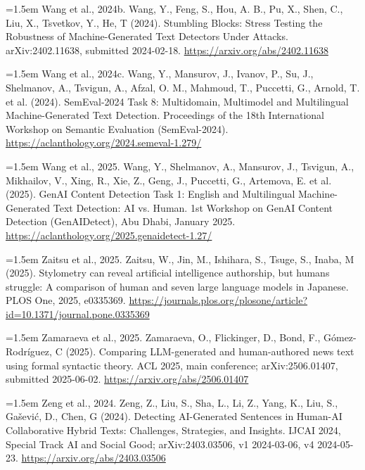 \documentclass[11pt,a4paper]{article}
\renewcommand{\_}{\textunderscore\allowbreak}
\begin{document}
\noindent\hangindent=1.5em Wang et al., 2024b. Wang, Y., Feng, S., Hou, A. B., Pu, X., Shen, C., Liu, X., Tsvetkov, Y., He, T (2024). Stumbling Blocks: Stress Testing the Robustness of Machine-Generated Text Detectors Under Attacks. arXiv:2402.11638, submitted 2024-02-18. \url{https://arxiv.org/abs/2402.11638}\par\smallskip

\noindent\hangindent=1.5em Wang et al., 2024c. Wang, Y., Mansurov, J., Ivanov, P., Su, J., Shelmanov, A., Tsvigun, A., Afzal, O. M., Mahmoud, T., Puccetti, G., Arnold, T. et al. (2024). SemEval-2024 Task 8: Multidomain, Multimodel and Multilingual Machine-Generated Text Detection. Proceedings of the 18th International Workshop on Semantic Evaluation (SemEval-2024). \url{https://aclanthology.org/2024.semeval-1.279/}\par\smallskip

\noindent\hangindent=1.5em Wang et al., 2025. Wang, Y., Shelmanov, A., Mansurov, J., Tsvigun, A., Mikhailov, V., Xing, R., Xie, Z., Geng, J., Puccetti, G., Artemova, E. et al. (2025). GenAI Content Detection Task 1: English and Multilingual Machine-Generated Text Detection: AI vs. Human. 1st Workshop on GenAI Content Detection (GenAIDetect), Abu Dhabi, January 2025. \url{https://aclanthology.org/2025.genaidetect-1.27/}\par\smallskip

\noindent\hangindent=1.5em Zaitsu et al., 2025. Zaitsu, W., Jin, M., Ishihara, S., Tsuge, S., Inaba, M (2025). Stylometry can reveal artificial intelligence authorship, but humans struggle: A comparison of human and seven large language models in Japanese. PLOS One, 2025, e0335369. \url{https://journals.plos.org/plosone/article?id=10.1371/journal.pone.0335369}\par\smallskip

\noindent\hangindent=1.5em Zamaraeva et al., 2025. Zamaraeva, O., Flickinger, D., Bond, F., G\'omez-Rodr\'iguez, C (2025). Comparing LLM-generated and human-authored news text using formal syntactic theory. ACL 2025, main conference; arXiv:2506.01407, submitted 2025-06-02. \url{https://arxiv.org/abs/2506.01407}\par\smallskip

\noindent\hangindent=1.5em Zeng et al., 2024. Zeng, Z., Liu, S., Sha, L., Li, Z., Yang, K., Liu, S., Ga\v{s}evi\'c, D., Chen, G (2024). Detecting AI-Generated Sentences in Human-AI Collaborative Hybrid Texts: Challenges, Strategies, and Insights. IJCAI 2024, Special Track AI and Social Good; arXiv:2403.03506, v1 2024-03-06, v4 2024-05-23. \url{https://arxiv.org/abs/2403.03506}\par\smallskip
\end{document}
